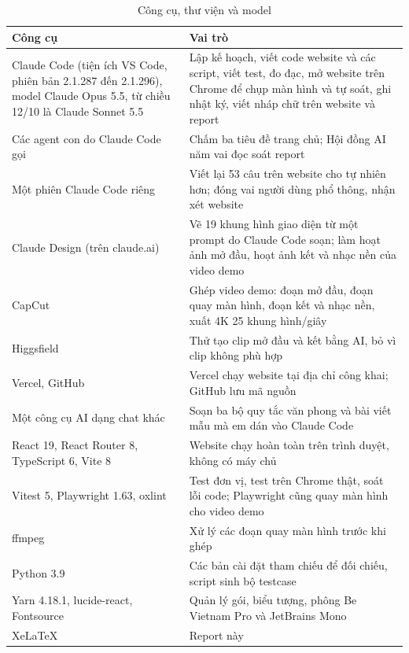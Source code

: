 \begin{table}[H]
  \centering
  \caption{Công cụ, thư viện và model}
  \label{tab:tools}
  \begin{tabularx}{\linewidth}{@{}>{\raggedright\arraybackslash}p{5.2cm}L@{}}
    \toprule
    \textbf{Công cụ} & \textbf{Vai trò} \\
    \midrule
    Claude Code (tiện ích VS Code, phiên bản 2.1.287 đến 2.1.296), model Claude Opus 5.5, từ chiều 12/10 là Claude Sonnet 5.5 & Lập kế hoạch, viết code website và các script, viết test, đo đạc, mở website trên Chrome để chụp màn hình và tự soát, ghi nhật ký, viết nháp chữ trên website và report \\
    Các agent con do Claude Code gọi & Chấm ba tiêu đề trang chủ; Hội đồng AI năm vai đọc soát report \\
    Một phiên Claude Code riêng & Viết lại 53 câu trên website cho tự nhiên hơn; đóng vai người dùng phổ thông, nhận xét website \\
    Claude Design (trên claude.ai) & Vẽ 19 khung hình giao diện từ một prompt do Claude Code soạn; làm hoạt ảnh mở đầu, hoạt ảnh kết và nhạc nền của video demo \\
    CapCut & Ghép video demo: đoạn mở đầu, đoạn quay màn hình, đoạn kết và nhạc nền, xuất 4K 25 khung hình/giây \\
    Higgsfield & Thử tạo clip mở đầu và kết bằng AI, bỏ vì clip không phù hợp \\
    Vercel, GitHub & Vercel chạy website tại địa chỉ công khai; GitHub lưu mã nguồn \\
    Một công cụ AI dạng chat khác & Soạn ba bộ quy tắc văn phong và bài viết mẫu mà em dán vào Claude Code \\
    React 19, React Router 8, TypeScript 6, Vite 8 & Website chạy hoàn toàn trên trình duyệt, không có máy chủ \\
    Vitest 5, Playwright 1.63, oxlint & Test đơn vị, test trên Chrome thật, soát lỗi code; Playwright cũng quay màn hình cho video demo \\
    ffmpeg & Xử lý các đoạn quay màn hình trước khi ghép \\
    Python 3.9 & Các bản cài đặt tham chiếu để đối chiếu, script sinh bộ testcase \\
    Yarn 4.18.1, lucide-react, Fontsource & Quản lý gói, biểu tượng, phông Be Vietnam Pro và JetBrains Mono \\
    XeLaTeX & Report này \\
    \bottomrule
  \end{tabularx}
\end{table}

